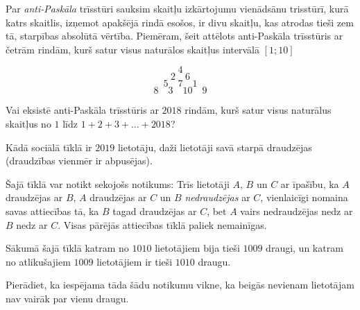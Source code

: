 



\renewcommand{\theenumi}{\alph{enumi}}



\noindent
 
\filbreak

\begin{problem}
Par \textit{anti-Paskāla} trīsstūri sauksim skaitļu izkārtojumu vienādsānu trisstūrī, kurā katrs skaitlis, izņemot apakšējā rindā esošos, ir divu skaitļu, kas atrodas tieši zem tā, starpības absolūtā vērtība. Piemēram, šeit attēlots anti-Paskāla trīsstūris ar četrām rindām, kurš satur visus naturālos skaitļus intervālā $[1;10]$

\[4\]
\[2\quad 6\]
\[5\quad 7 \quad 1\]
\[8\quad 3 \quad 10 \quad 9\]

Vai eksistē anti-Paskāla trīsstūris ar $2018$ rindām, kurš satur visus naturālus skaitļus no $1$ līdz $1 + 2 + 3 + \dots + 2018$?

\end{problem}


\begin{problem}
Kādā sociālā tīklā ir $2019$ lietotāju, daži lietotāji savā starpā draudzējas (draudzības vienmēr ir abpusējas).

Šajā tīklā var notikt sekojošs notikums: Trīs lietotāji $A$, $B$ un $C$ ar īpašību, ka $A$ draudzējas ar $B$, $A$ draudzējas ar $C$ un $B$ \textit{nedraudzējas} ar $C$, vienlaicīgi nomaina savas attiecības tā, ka $B$ tagad draudzējas ar $C$, bet $A$ vairs nedraudzējas nedz ar $B$ nedz ar $C$. Visas pārējās attiecības tīklā paliek nemainīgas.

Sākumā šajā tīklā katram no $1010$ lietotājiem bija tieši $1009$ draugi, un katram no atlikušajiem $1009$ lietotājiem ir tieši $1010$ draugu.

Pierādiet, ka iespējama tāda šādu notikumu vikne, ka beigās nevienam lietotājam nav vairāk par vienu draugu.

\end{problem}

